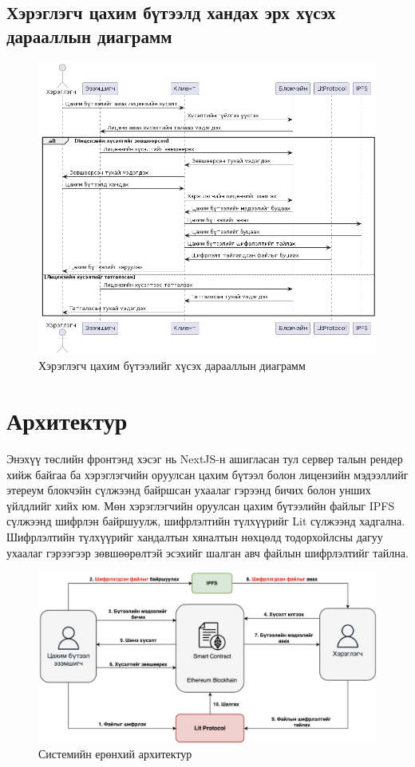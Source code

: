 \subsection{Хэрэглэгч цахим бүтээлд хандах эрх хүсэх дарааллын диаграмм}
\begin{figure}[h!]
	\centering
	\includegraphics[scale=0.6, angle=90]{src/images/sequence-2.png}
	\caption{Хэрэглэгч цахим бүтээлийг хүсэх дарааллын диаграмм}
\end{figure}

\newpage
\section{Архитектур}
Энэхүү төслийн фронтэнд хэсэг нь NextJS-н ашигласан тул сервер талын рендер хийж байгаа ба хэрэглэгчийн оруулсан цахим бүтээл болон лицензийн мэдээллийг этереум блокчэйн сүлжээнд байршсан ухаалаг гэрээнд бичих болон унших үйлдлийг хийх юм. Мөн хэрэглэгчийн оруулсан цахим бүтээлийн файлыг IPFS сүлжээнд шифрлэн байршуулж, шифрлэлтийн түлхүүрийг Lit сүлжээнд хадгална. Шифрлэлтийн түлхүүрийг хандалтын хяналтын нөхцөлд тодорхойлсны дагуу ухаалаг гэрээгээр зөвшөөрөлтэй эсэхийг шалган авч файлын шифрлэлтийг тайлна.

\begin{figure}[h!]
	\centering
	\includegraphics[scale=0.26]{src/images/architecture.png}
	\caption{Системийн ерөнхий архитектур}
\end{figure}
